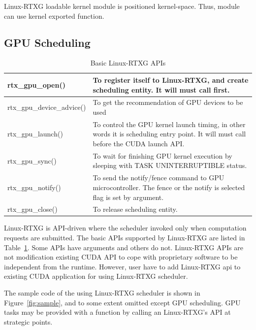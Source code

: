Linux-RTXG loadable kernel module is positioned kernel-space.
Thus, module can use kernel exported function.

\subsection{GPU Scheduling}
\begin{table}[t]
\begin{center}
\caption{Basic Linux-RTXG APIs}
\label{tab:rtx-api}
\begin{tabular}{|l|p{50em}|} \hline
rtx\_gpu\_open() & To register itself to Linux-RTXG, and create scheduling entity. It will must call first. \\ \hline
rtx\_gpu\_device\_advice() & To get the recommendation of GPU devices to be used \\ \hline
rtx\_gpu\_launch() & To control the GPU kernel launch timing, in other words it is scheduling entry point. It will must call before the CUDA launch API. \\ \hline
rtx\_gpu\_sync() & To wait for finishing GPU kernel execution by sleeping with TASK UNINTERRUPTIBLE status.\\ \hline
rtx\_gpu\_notify() & To send the notify/fence command to GPU microcontroller. The fence or the notify is selected flag is set by argument.\\ \hline
rtx\_gpu\_close() & To release scheduling entity.\\ \hline
\end{tabular}
\end{center}
\end{table}

Linux-RTXG is API-driven where the scheduler invoked only when computation requests are submitted.
The basic APIs supported by Linux-RTXG are listed in Table~\ref{tab:rtx-api}.
Some APIs have arguments and others do not.
Linux-RTXG APIs are not modification existing CUDA API to cope with proprietary software to be independent from the runtime.
However, user have to add Linux-RTXG api to existing CUDA application for using Linux-RTXG scheduler.

The sample code of the using Linux-RTXG scheduler is shown in Figure~\ref{fig:sample},
and to some extent omitted except GPU scheduling.
GPU tasks may be provided with a function by calling an Linux-RTXG's API at strategic points.

